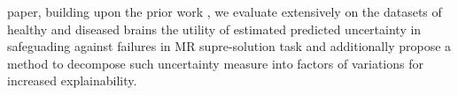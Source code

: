 paper, building upon the prior work  \cite{tanno2017bayesian}, we evaluate extensively on the datasets of healthy and diseased brains the utility of estimated predicted uncertainty in safeguading against failures in MR supre-solution task and additionally propose a method to decompose such uncertainty measure into factors of variations for increased explainability. 








%


